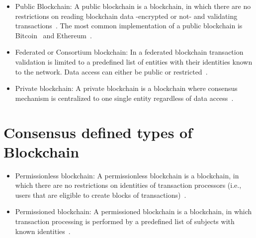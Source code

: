\begin{itemize}
  \item Public Blockchain: A public blockchain is a blockchain, in which there are no restrictions on reading blockchain data -encrypted or not- and validating transactions~\cite{prbc_vs_pubbc}.
  The most common implementation of a public blockchain is Bitcoin~\cite{nakamoto2012bitcoin} and Ethereum~\cite{ethash}.
  \item Federated or Consortium blockchain: In a federated blockchain transaction validation is limited to a predefined list of entities with their identities known to the network. Data access can either be public or restricted~\cite{prbc_vs_pubbc}.
  \item Private blockchain: A private blockchain is a blockchain where consensus mechanism is centralized to one single entity regardless of data access~\cite{prbc_vs_pubbc}.
\end{itemize}

\section{Consensus defined types of Blockchain}\label{blockchain:consensus_blockchain_types}

\begin{itemize}
  \item Permissionless blockchain: A permissionless blockchain is a blockchain, in which there are no restrictions on identities of transaction processors (i.e., users that are eligible to create blocks of transactions)~\cite{prbc_vs_pubbc}.
  \item Permissioned blockchain: A permissioned blockchain is a blockchain, in which transaction processing is performed by a predefined list of subjects with known identities~\cite{prbc_vs_pubbc}.
\end{itemize}

\begin{table}[]
  \centering
  \caption{Blockchain Types. Source~\cite{hub-bl-types}}
  \label{table:blockchain_types}
\end{table}


